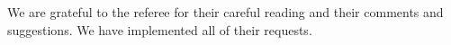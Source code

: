 \documentclass{article}
\renewcommand{\-}{\hyp{}}
\numberwithin{equation}{section}
\begin{document}
We are grateful to the referee for their careful reading and their comments and suggestions. We have implemented all of their requests.
\end{document}
